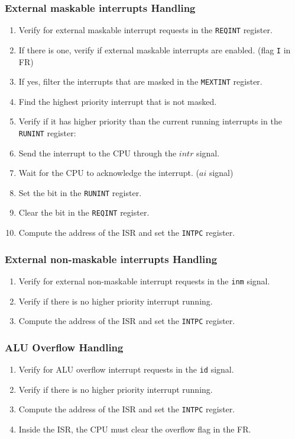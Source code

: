 \begin{frame}
    \frametitle{External maskable interrupts Handling}
    \begin{enumerate}
        \item Verify for external maskable interrupt requests in the \texttt{REQINT} register.
        \item If there is one, verify if external maskable interrupts are enabled. (flag \texttt{I} in FR)
        \item If yes, filter the interrupts that are masked in the \texttt{MEXTINT} register.
        \item Find the highest priority interrupt that is not masked.
        \item Verify if it has higher priority than the current running interrupts in the \texttt{RUNINT} register:
        \item Send the interrupt to the CPU through the $intr$ signal.
        \item Wait for the CPU to acknowledge the interrupt. ($ai$ signal)
        \item Set the bit in the \texttt{RUNINT} register.
        \item Clear the bit in the \texttt{REQINT} register.
        \item Compute the address of the ISR and set the \texttt{INTPC} register.
    \end{enumerate}
\end{frame}

\begin{frame}
    \frametitle{External non-maskable interrupts Handling}
    \begin{enumerate}
        \item Verify for external non-maskable interrupt requests in the \texttt{inm} signal.
        \item Verify if there is no higher priority interrupt running.
        \item Compute the address of the ISR and set the \texttt{INTPC} register.
    \end{enumerate}
\end{frame}

\begin{frame}
    \frametitle{ALU Overflow Handling}
    \begin{enumerate}
        \item Verify for ALU overflow interrupt requests in the \texttt{id} signal.
        \item Verify if there is no higher priority interrupt running.
        \item Compute the address of the ISR and set the \texttt{INTPC} register.
        \item Inside the ISR, the CPU must clear the  overflow flag in the FR.
    \end{enumerate}
\end{frame}

